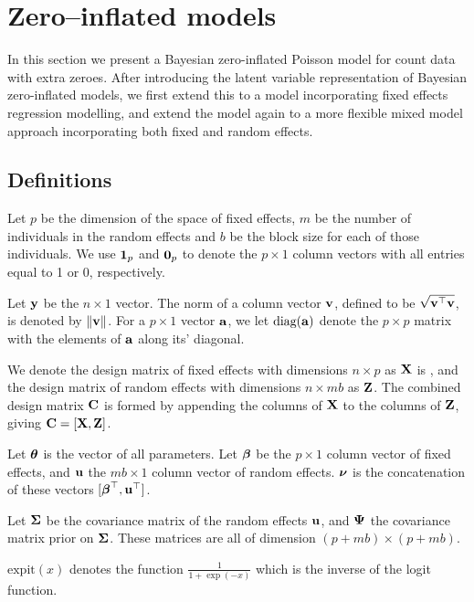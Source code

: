 \section{Zero--inflated models}
\label{sec:model}

In this section we present a Bayesian zero-inflated Poisson model for count data with extra zeroes. After
introducing the latent variable representation of Bayesian zero-inflated models, we first extend this to
a model incorporating fixed effects regression modelling, and extend the model again to a more flexible mixed 
model approach incorporating both fixed and random effects.

\subsection{Definitions}

Let $p$ be the dimension of the space of fixed effects, $m$ be the number of individuals in the random effects
and $b$ be the block size for each of those individuals. We use ${\bf 1}_p$ and ${\bf 0}_p$ to denote the $p
\times 1$ column vectors with all entries equal to 1 or 0, respectively.

Let ${\bf y}$ be the $n \times 1$ vector. The norm of a column vector ${\bf v}$, defined to be $\sqrt{{\bf v}^\top {\bf v}}$,
is  denoted by $\|{\bf v}\|$. For a $p \times 1$ vector ${\bf a}$, we let $\text{diag}{({\bf a})}$ denote the $p \times p$
matrix with the elements of ${\bf a}$ along its' diagonal.

We denote the design matrix of fixed effects with dimensions $n \times p$ as ${\bf X}$ is , and the design matrix
of random  effects with dimensions $n \times m b$ as ${\bf Z}$. The combined design matrix ${\bf C}$ is formed by
appending the columns of ${\bf X}$ to the columns of ${\bf Z}$, giving ${\bf C} = [ {\bf X}, {\bf Z} ]$.

Let ${\boldsymbol \theta}$ is the vector of all parameters.
Let ${\boldsymbol \beta}$ be the $p \times 1$ column vector of fixed
effects, and ${\bf u}$ the $m b \times 1$ column vector of random effects. ${\boldsymbol \nu}$ is the
concatenation of these vectors $[{\boldsymbol \beta}^\top, {\bf u}^\top]$.

Let ${\boldsymbol \Sigma}$ be the covariance matrix of the random effects ${\bf u}$,
and 
${\boldsymbol \Psi}$ the covariance matrix prior on ${\boldsymbol \Sigma}$.
These matrices are all of dimension $(p + m b) \times (p + m b)$.


$\text{expit}(x)$ denotes the function $\tfrac{1}{1 + \exp(-x)}$ which is the inverse of the logit
function.

